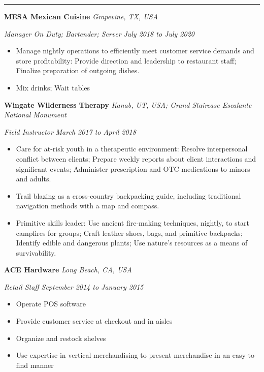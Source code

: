 \documentclass[10pt, a4paper]{article}
\newcommand{\rangesep}{to\xspace}  %
\renewcommand{\date}[1]{\textit{#1}}
\newcommand{\location}[1]{\textit{#1}}
\newcommand{\heading}[1]{
    \makebox[0pt][l]{\Large \sc \hspace{2pt}#1}
    \rule[-0.7ex]{\columnwidth}{0.5pt}\vspace{1.0ex}
}
\newcommand{\subheading}[1]{{\bfseries #1}}
\newcommand{\subheadSkip}{\vspace{0.7ex}}
\newenvironment{mysection}[1]
{\vspace{2.5ex}
\heading{#1}
\begin{adjustwidth}{0.3cm}{0cm}}
{\end{adjustwidth} }
\begin{document}
    \newpage
    \begin{mysection}{Employment \large{(continued)}}

        \subheadSkip
        \subheading{MESA Mexican Cuisine} \hfill \location{Grapevine, TX, USA}

        \textit{Manager On Duty; Bartender; Server} \hfill \date{July 2018 \rangesep July 2020}

        \begin{itemize}
            \item Manage nightly operations to efficiently meet customer service demands and store profitability: Provide direction and leadership to restaurant staff; Finalize preparation of outgoing dishes.
            \item Mix drinks; Wait tables
        \end{itemize}

        \subheadSkip
        \subheading{Wingate Wilderness Therapy} \hfill \location{Kanab, UT, USA; Grand Staircase Escalante National Monument}

        \vspace{0.1ex}
        \textit{Field Instructor} \hfill \date{March 2017 \rangesep April 2018}
        \begin{itemize}
            \item Care for at-risk youth in a therapeutic environment: Resolve interpersonal conflict between clients; Prepare weekly reports about client interactions and significant events; Administer prescription and OTC medications to minors and adults.
            \item Trail blazing as a cross-country backpacking guide, including traditional navigation methods with a map and compass.
            \item Primitive skills leader: Use ancient fire-making techniques, nightly, to start campfires for groups; Craft leather shoes, bags, and primitive backpacks; Identify edible and dangerous plants; Use nature's resources as a means of survivability.
        \end{itemize}

        \subheadSkip
        \subheading{ACE Hardware} \hfill \location{Long Beach, CA, USA}

        \vspace{0.1ex}
        \textit{Retail Staff} \hfill \date{September 2014 \rangesep January 2015}
        \begin{itemize}
            \item Operate POS software
            \item Provide customer service at checkout and in aisles
            \item Organize and restock shelves
            \item Use expertise in vertical merchandising to present merchandise in an easy-to-find manner
        \end{itemize}
    \end{mysection} 
\end{document}
